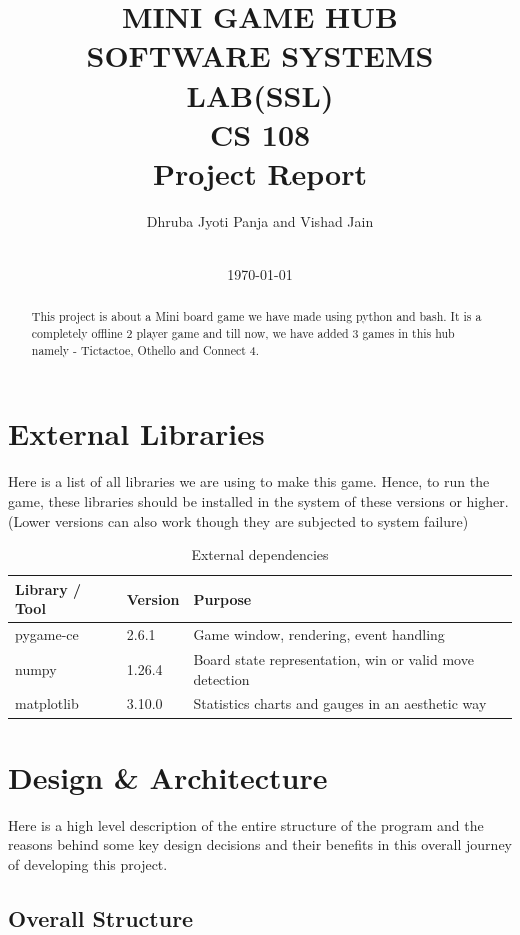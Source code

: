 \documentclass[12pt, a4paper]{article}
\title{
    \vspace{-1cm}
    {\LARGE \textbf{MINI GAME HUB}} \\[0.4em]
    {\large SOFTWARE SYSTEMS LAB(SSL)} \\[0.1em]
    {\large CS 108}\\
    {\normalsize Project Report}
}
\author{
    Dhruba Jyoti Panja and Vishad Jain\\ \\[0.3em]
}
\date{\today}
\begin{document}
\maketitle
\thispagestyle{empty}
\vspace{1em}

\begin{abstract}
    This project is about a Mini board game we have made using python and bash. It is a completely offline 2 player game and till now, we have added 3 games in this hub namely - Tictactoe, Othello and Connect 4.
\end{abstract}

\newpage
\tableofcontents
\newpage

\section{External Libraries}

Here is a list of all libraries we are using to make this game. Hence, to run the game, these libraries should be installed in the system of these versions or higher. (Lower versions can also work though they are subjected to system failure)

\begin{table}[h!]
\centering
\begin{tabular}{lll}
\toprule
\textbf{Library / Tool} & \textbf{Version} & \textbf{Purpose} \\
\midrule
pygame-ce       & 2.6.1 & Game window, rendering, event handling \\
numpy        & 1.26.4 & Board state representation, win or valid move detection \\
matplotlib   & 3.10.0 & Statistics charts and gauges in an aesthetic way \\

\bottomrule
\end{tabular}
\caption{External dependencies}
\end{table}


\section{Design \& Architecture}

Here is a high level description of the entire structure of the program and the reasons behind some key design decisions and their benefits in this overall journey of developing this project.

\subsection{Overall Structure}
\end{document}
